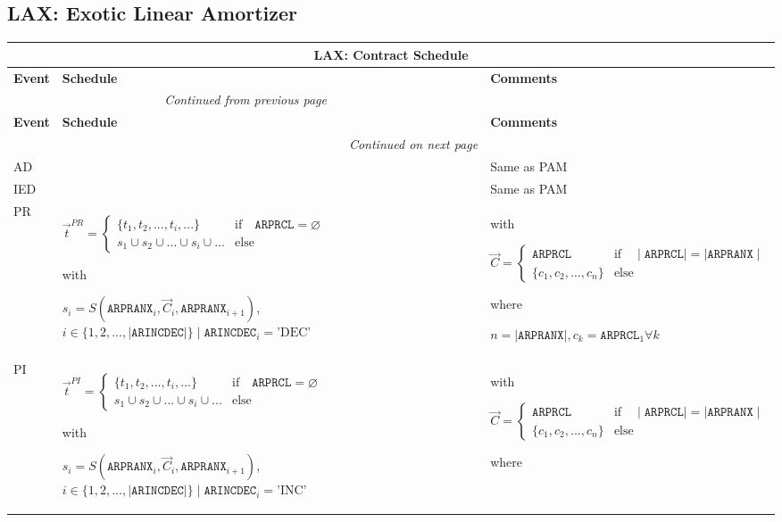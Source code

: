 \documentclass[9pt,oneside]{amsart}
\newenvironment{schedule}[1]{
	\hfill %
	\begin{longtable}{| p{0.05\textwidth} | p{0.5\textwidth} |  p{0.4\textwidth} |}
	\multicolumn{3}{c}{\textbf{#1: Contract Schedule}}\\
	\hline
	\textbf{Event} & \textbf{Schedule} & \textbf{Comments} \\
	\hline
	\endfirsthead
	\multicolumn{2}{c}{\textit{Continued from previous page}} \\
	\hline
	\textbf{Event} & \textbf{Schedule} & \textbf{Comments} \\
	\hline
	\endhead
	\hline \multicolumn{2}{r}{\textit{Continued on next page}} \\
	\endfoot
	\endlastfoot
}{%
	\hline
	\end{longtable}
}
\newcommand{\attr}[1]{\texttt{#1}}
\newcommand{\sdl}[3]{S(#1,#2,#3)}
\newcommand{\undef}{\varnothing}
\begin{document}
\subsection{LAX: Exotic Linear Amortizer}\label{sec:lax}


\begin{schedule}{LAX}
	AD & & Same as PAM \\
	\hline
	IED & & Same as PAM \\
	\hline
	PR & $\vec{t}^{PR} = \begin{cases} \{ t_1, t_2, ..., t_i, ... \} & \text{if}\quad \attr{ARPRCL}=\undef \\
					s_1 \cup s_2 \cup ... \cup s_i \cup ... & \text{else} \end{cases}$ \par
		with\par
		$s_i=\sdl{\attr{ARPRANX}_i}{\vec{C}_i}{\attr{ARPRANX}_{i+1}}$, $i\in\{1,2,...,\mid\attr{ARINCDEC}\mid\} \mid \attr{ARINCDEC}_i = \text{'DEC'}$
		& with\par $\vec{C} = \begin{cases} \attr{ARPRCL} & \text{if} \quad \mid\attr{ARPRCL}\mid = \mid \attr{ARPRANX}\mid \\
				   \{ c_1, c_2, ..., c_n \}  & \text{else} \end{cases}$ \par
			where\par
			$n=\mid\attr{ARPRANX}\mid, c_k=\attr{ARPRCL}_1\forall k$ \\
	\hline
	PI & $\vec{t}^{PI} = \begin{cases} \{ t_1, t_2, ..., t_i, ... \} & \text{if}\quad \attr{ARPRCL}=\undef \\
					s_1 \cup s_2 \cup ... \cup s_i \cup ... & \text{else} \end{cases}$ \par
		with\par
		$s_i=\sdl{\attr{ARPRANX}_i}{\vec{C}_i}{\attr{ARPRANX}_{i+1}}$, $i\in\{1,2,...,\mid\attr{ARINCDEC}\mid\} \mid \attr{ARINCDEC}_i = \text{'INC'}$
		& with\par $\vec{C} = \begin{cases} \attr{ARPRCL} & \text{if} \quad \mid\attr{ARPRCL}\mid = \mid \attr{ARPRANX}\mid \\
				   \{ c_1, c_2, ..., c_n \}  & \text{else} \end{cases}$ \par
			where\par

\end{schedule}
\end{document}
